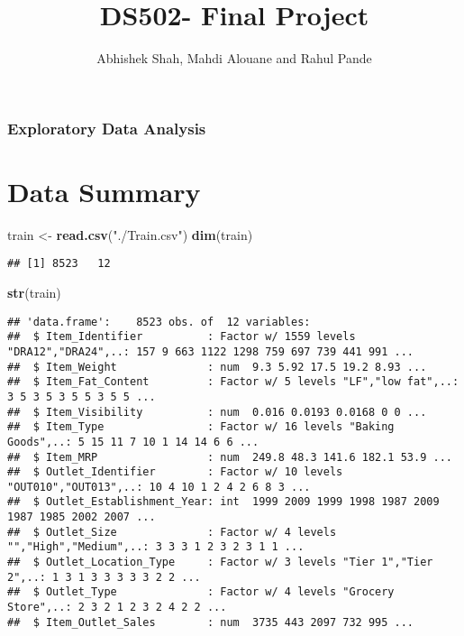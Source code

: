 \documentclass[]{article}
\title{DS502- Final Project}
\author{Abhishek Shah, Mahdi Alouane and Rahul Pande}
\date{}
\newenvironment{Shaded}{\begin{snugshade}}{\end{snugshade}}
\newcommand{\KeywordTok}[1]{\textcolor[rgb]{0.13,0.29,0.53}{\textbf{#1}}}
\newcommand{\StringTok}[1]{\textcolor[rgb]{0.31,0.60,0.02}{#1}}
\newcommand{\NormalTok}[1]{#1}
\begin{document}
\maketitle

\subsubsection{Exploratory Data
Analysis}\label{exploratory-data-analysis}

\section{Data Summary}\label{data-summary}

\begin{Shaded}
\begin{Highlighting}[]
\NormalTok{train <-}\StringTok{ }\KeywordTok{read.csv}\NormalTok{(}\StringTok{"./Train.csv"}\NormalTok{)}
\KeywordTok{dim}\NormalTok{(train)}
\end{Highlighting}
\end{Shaded}

\begin{verbatim}
## [1] 8523   12
\end{verbatim}

\begin{Shaded}
\begin{Highlighting}[]
\KeywordTok{str}\NormalTok{(train)}
\end{Highlighting}
\end{Shaded}

\begin{verbatim}
## 'data.frame':    8523 obs. of  12 variables:
##  $ Item_Identifier          : Factor w/ 1559 levels "DRA12","DRA24",..: 157 9 663 1122 1298 759 697 739 441 991 ...
##  $ Item_Weight              : num  9.3 5.92 17.5 19.2 8.93 ...
##  $ Item_Fat_Content         : Factor w/ 5 levels "LF","low fat",..: 3 5 3 5 3 5 5 3 5 5 ...
##  $ Item_Visibility          : num  0.016 0.0193 0.0168 0 0 ...
##  $ Item_Type                : Factor w/ 16 levels "Baking Goods",..: 5 15 11 7 10 1 14 14 6 6 ...
##  $ Item_MRP                 : num  249.8 48.3 141.6 182.1 53.9 ...
##  $ Outlet_Identifier        : Factor w/ 10 levels "OUT010","OUT013",..: 10 4 10 1 2 4 2 6 8 3 ...
##  $ Outlet_Establishment_Year: int  1999 2009 1999 1998 1987 2009 1987 1985 2002 2007 ...
##  $ Outlet_Size              : Factor w/ 4 levels "","High","Medium",..: 3 3 3 1 2 3 2 3 1 1 ...
##  $ Outlet_Location_Type     : Factor w/ 3 levels "Tier 1","Tier 2",..: 1 3 1 3 3 3 3 3 2 2 ...
##  $ Outlet_Type              : Factor w/ 4 levels "Grocery Store",..: 2 3 2 1 2 3 2 4 2 2 ...
##  $ Item_Outlet_Sales        : num  3735 443 2097 732 995 ...
\end{verbatim}
\end{document}
